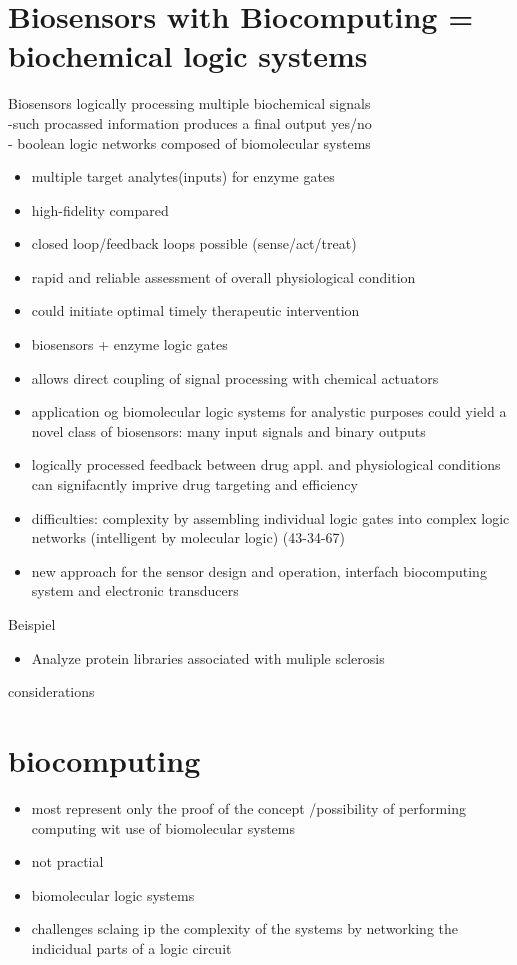 \documentclass[runningheads]{llncs}
\begin{document}
\section{Biosensors with Biocomputing = biochemical logic systems}
	Biosensors logically processing multiple biochemical signals\\
	-such procassed information produces a final output yes/no \\
	- boolean logic networks composed of biomolecular systems\\
	
	\begin{itemize}
		\item multiple target analytes(inputs) for enzyme gates
		\item high-fidelity compared
		\item closed loop/feedback loops possible (sense/act/treat)
		\item rapid and reliable assessment of overall physiological condition
		\item could initiate optimal timely therapeutic intervention
		\item biosensors + enzyme logic gates
		\item allows direct coupling of signal processing with chemical actuators 
		\item application og biomolecular logic systems for analystic purposes could yield a novel class of biosensors: many input signals and binary outputs
		\item logically processed feedback between drug appl. and physiological conditions can signifacntly imprive drug targeting and efficiency 
		
		\item difficulties: complexity by assembling individual logic gates into complex logic networks (intelligent by molecular logic) (43-34-67)
		\item new approach for the sensor design and operation, interfach biocomputing system and electronic transducers
	\end{itemize}

Beispiel
	\begin{itemize}
		\item Analyze protein libraries associated with muliple sclerosis 
	\end{itemize}
considerations
	
\section{biocomputing}
	\begin{itemize}
		\item most represent only the proof of the concept /possibility of performing computing wit use of biomolecular systems 
		\item not practial
		\item biomolecular logic systems
		\item challenges sclaing ip the complexity of the systems by networking the indicidual parts of a logic circuit 
		
	\end{itemize}
\end{document}
